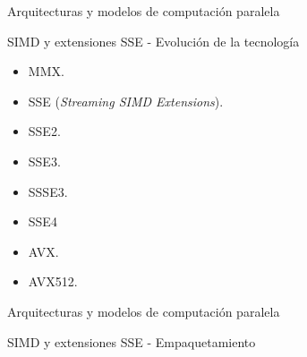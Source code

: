 \begin{frame}{Arquitecturas y modelos de computación paralela}
\begin{block}{SIMD y extensiones SSE - Evolución de la tecnología}
\begin{itemize}
  \item MMX.
  \item SSE (\textit{Streaming SIMD Extensions}).
  \item SSE2.
  \item SSE3.
  \item SSSE3.
  \item SSE4
  \item AVX.
  \item AVX512.
\end{itemize}
\end{block}
\end{frame}

\begin{frame}{Arquitecturas y modelos de computación paralela}
\begin{block}{SIMD y extensiones SSE - Empaquetamiento}
  \centerline{}
\end{block}
\end{frame}